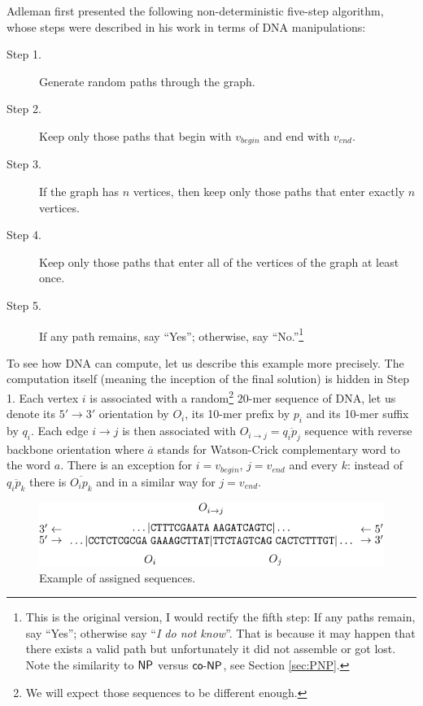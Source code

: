		Adleman first presented the following non-deterministic five-step algorithm, whose steps were described in his work in terms of DNA manipulations:
		\begin{description}
			\item[Step 1.] Generate random paths through the graph.
			\item[Step 2.] Keep only those paths that begin with $v_{begin}$ and end with $v_{end}$.
			\item[Step 3.] If the graph has $n$ vertices, then keep only those paths that enter exactly $n$ vertices.
			\item[Step 4.] Keep only those paths that enter all of the vertices of the graph at least once.
			\item[Step 5.] If any path remains, say ``Yes''; otherwise, say ``No.''\footnote{This is the original version, I would rectify the fifth step: If any paths remain, say ``Yes''; otherwise say ``{\em I do not know}''. That is because it may happen that there exists a valid path but unfortunately it did not assemble or got lost. Note the similarity to $\mathsf{NP}$ versus $\mathsf{co}\textnormal{-}\mathsf{NP}$, see Section \ref{sec:PNP}.} %
		\end{description}
		To see %
		how DNA can compute, let us describe this example more precisely. The computation itself (meaning the inception of the final solution) is hidden in Step 1. Each vertex $i$ is associated with a random\footnote{We will expect those sequences to be different enough.} $20$-mer sequence of DNA, let us denote its $5'\rightarrow 3'$ orientation by $O_i$, its 10-mer prefix by $p_i$ and its 10-mer suffix by $q_i$. Each edge $i\rightarrow j$ is then associated with $O_{i\rightarrow j} = \overline{q_i p_j}$ sequence with reverse backbone orientation where $\overline{a}$ stands for Watson-Crick complementary word to the word $a$. There is an exception for $i=v_{begin}$, $j=v_{end}$ and every $k$: instead of $\overline{q_i p_k}$ there is $\overline{O_i p_k}$ and in a similar way for $j=v_{end}$.
		
		\begin{figure}[H]
		\begin{center}
			\includegraphics{./figures/adleman_strands.pdf}
			\caption{Example of assigned sequences.}
			\label{fig:adleman_strands}
		\end{center}
		\end{figure}
		
